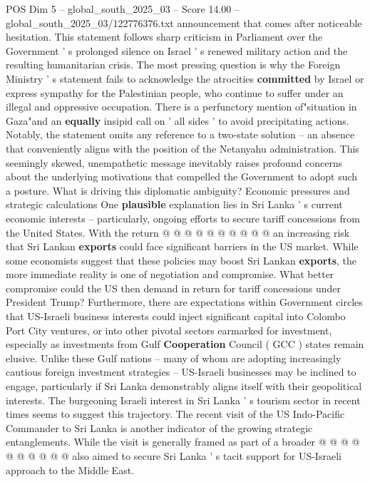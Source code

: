 \begin{textsample}{POS Dim 5 – global\_south\_2025\_03 – Score 14.00 – global\_south\_2025\_03/122776376.txt}  \label{ex:f5_pos_187}
announcement that comes after noticeable hesitation.
This statement follows sharp criticism in Parliament over the Government ' s prolonged silence on Israel ' s renewed military action and the resulting humanitarian crisis.
The most pressing question is why the Foreign Ministry ' s statement fails to acknowledge the atrocities \textbf{committed} by Israel or express sympathy for the Palestinian people, who continue to suffer under an illegal and oppressive occupation.
There is a perfunctory mention of"situation in Gaza"and an \textbf{equally} insipid call on ' all sides ' to avoid precipitating actions.
Notably, the statement omits any reference to a two-state solution -- an absence that conveniently aligns with the position of the Netanyahu administration.
This seemingly skewed, unempathetic message inevitably raises profound concerns about the underlying motivations that compelled the Government to adopt such a posture.
What is driving this diplomatic ambiguity?
Economic pressures and strategic calculations One \textbf{plausible} explanation lies in Sri Lanka ' s current economic interests -- particularly, ongoing efforts to secure tariff concessions from the United States.
With the return @ @ @ @ @ @ @ @ @ @ an increasing risk that Sri Lankan \textbf{exports} could face significant barriers in the US market.
While some economists suggest that these policies may boost Sri Lankan \textbf{exports}, the more immediate reality is one of negotiation and compromise.
What better compromise could the US then demand in return for tariff concessions under President Trump?
Furthermore, there are expectations within Government circles that US-Israeli business interests could inject significant capital into Colombo Port City ventures, or into other pivotal sectors earmarked for investment, especially as investments from Gulf \textbf{Cooperation} Council ( GCC ) states remain elusive.
Unlike these Gulf nations -- many of whom are adopting increasingly cautious foreign investment strategies -- US-Israeli businesses may be inclined to engage, particularly if Sri Lanka demonstrably aligns itself with their geopolitical interests.
The burgeoning Israeli interest in Sri Lanka ' s tourism sector in recent times seems to suggest this trajectory.
The recent visit of the US Indo-Pacific Commander to Sri Lanka is another indicator of the growing strategic entanglements.
While the visit is generally framed as part of a broader @ @ @ @ @ @ @ @ @ @ also aimed to secure Sri Lanka ' s tacit support for US-Israeli approach to the Middle East.

\end{textsample}
